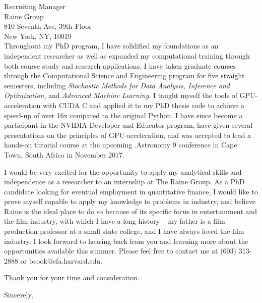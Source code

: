 \documentclass{letter}
\begin{document}
\begin{letter}{Recruiting Manager\\
Raine Group\\
810 Seventh Ave, 39th Floor\\
New York, NY, 10019\\
}
\noindent Throughout my PhD program, I have solidified my foundations
as an independent researcher as well as expanded my computational
training through both course study and research applications. I have
taken graduate courses through the Computational Science and
Engineering program for five straight semesters, including
\textit{Stochastic Methods for Data Analysis, Inference and
  Optimization}, and \textit{Advanced Machine Learning}. I taught
myself the tools of GPU-acceleration with CUDA C and applied it to my
PhD thesis code to achieve a speed-up of over 16x compared to the
original Python. I have since become a participant in the NVIDIA
Developer and Educator program, have given several presentations on
the principles of GPU-acceleration, and was accepted to lead a
hands-on tutorial course at the upcoming .Astronomy 9 conference in
Cape Town, South Africa in November 2017.

\noindent I would be very excited for the opportunity to apply my
analytical skills and independence as a researcher to an internship at
The Raine Group. As a PhD candidate looking for eventual employment in
quantitative finance, I would like to prove myself capable to apply my
knowledge to problems in industry, and believe Raine is the ideal
place to do so because of its specific focus in entertainment and the
film industry, with which I have a long history -- my father is a film
production professor at a small state college, and I have always loved
the film industry. I look forward to hearing back from you and
learning more about the opportunities available this summer. Please
feel free to contact me at (603) 313-2888 or bcook@cfa.harvard.edu.

Thank you for your time and consideration.


\closing{Sincerely,}


\end{letter}
\end{document}
